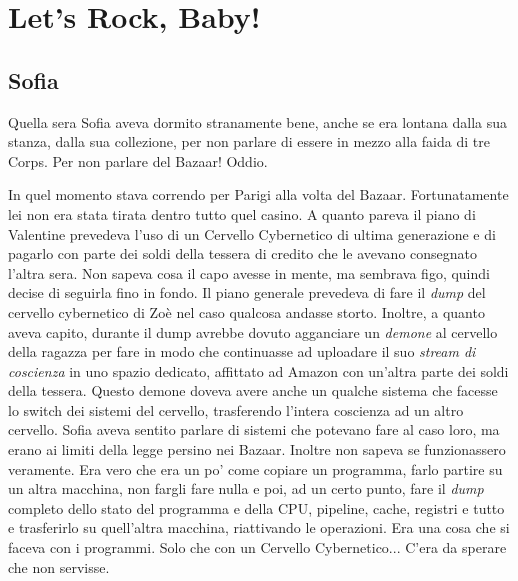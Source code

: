 \chapter{Let's Rock, Baby!}

  \section*{Sofia}

    Quella sera Sofia aveva dormito stranamente bene, anche se era lontana dalla sua stanza, dalla sua collezione, per
    non parlare di essere in mezzo alla faida di tre Corps. Per non parlare del Bazaar! Oddio.

    In quel momento stava correndo per Parigi alla volta del Bazaar. Fortunatamente lei non era stata tirata dentro
    tutto quel casino. A quanto pareva il piano di Valentine prevedeva l'uso di un Cervello Cybernetico di ultima
    generazione e di pagarlo con parte dei soldi della tessera di credito che le avevano consegnato l'altra sera. Non
    sapeva cosa il capo avesse in mente, ma sembrava figo, quindi decise di seguirla fino in fondo.
    Il piano generale prevedeva di fare il \emph{dump} del cervello cybernetico di Zoè nel caso qualcosa andasse storto.
    Inoltre, a quanto aveva capito, durante il dump avrebbe dovuto agganciare un \emph{demone} al cervello della ragazza
    per fare in modo che continuasse ad uploadare il suo \emph{stream di coscienza} in uno spazio dedicato, affittato
    ad Amazon con un'altra parte dei soldi della tessera. Questo demone doveva avere anche un qualche sistema che facesse lo
    switch dei sistemi del cervello, trasferendo l'intera coscienza ad un altro cervello. Sofia aveva sentito parlare di
    sistemi che potevano fare al caso loro, ma erano ai limiti della legge persino nei Bazaar. Inoltre non sapeva se
    funzionassero veramente. Era vero che era un po' come copiare un programma, farlo partire su un altra macchina, non
    fargli fare nulla e poi, ad un certo punto, fare il \emph{dump} completo dello stato del programma e della CPU,
    pipeline, cache, registri e tutto e trasferirlo su quell'altra macchina, riattivando le operazioni. Era una cosa che
    si faceva con i programmi. Solo che con un Cervello Cybernetico... C'era da sperare che non servisse.

